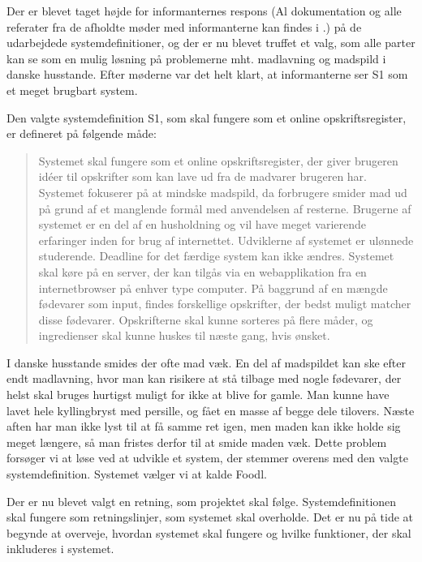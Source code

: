 Der er blevet taget højde for informanternes respons (Al dokumentation og alle referater fra de afholdte møder med informanterne kan findes i .) på de udarbejdede systemdefinitioner, og der er nu blevet truffet et valg, som alle parter kan se som en mulig løsning på problemerne mht. madlavning og madspild i danske husstande. Efter møderne var det helt klart, at informanterne ser S1 som et meget brugbart system. 

Den valgte systemdefinition S1, som skal fungere som et online opskriftsregister, er defineret på følgende måde:

\begin{quote}
Systemet skal fungere som et online opskriftsregister, der giver brugeren idéer til opskrifter som kan lave ud fra de madvarer brugeren har. Systemet fokuserer på at mindske madspild, da forbrugere smider mad ud på grund af et manglende formål med anvendelsen af resterne. Brugerne af systemet er en del af en husholdning og vil have meget varierende erfaringer inden for brug af internettet. Udviklerne af systemet er ulønnede studerende. Deadline for det færdige system kan ikke ændres. Systemet skal køre på en server, der kan tilgås via en webapplikation fra en internetbrowser på enhver type computer. På baggrund af en mængde fødevarer som input, findes forskellige opskrifter, der bedst muligt matcher disse fødevarer. Opskrifterne skal kunne sorteres på flere måder, og ingredienser skal kunne huskes til næste gang, hvis ønsket.
\end{quote}

I danske husstande smides der ofte mad væk. En del af madspildet kan \fx ske efter endt madlavning, hvor man kan risikere at stå tilbage med nogle fødevarer, der helst skal bruges hurtigst muligt for ikke at blive for gamle. Man kunne \fx have lavet hele kyllingbryst med persille, og fået en masse af begge dele tilovers. Næste aften har man ikke lyst til at få samme ret igen, men maden kan ikke holde sig meget længere, så man fristes derfor til at smide maden væk. Dette problem forsøger vi at løse ved at udvikle et system, der stemmer overens med den valgte systemdefinition. Systemet vælger vi at kalde Foodl.

Der er nu blevet valgt en retning, som projektet skal følge. Systemdefinitionen skal fungere som retningslinjer, som systemet skal overholde. Det er nu på tide at begynde at overveje, hvordan systemet skal fungere og hvilke funktioner, der skal inkluderes i systemet.
